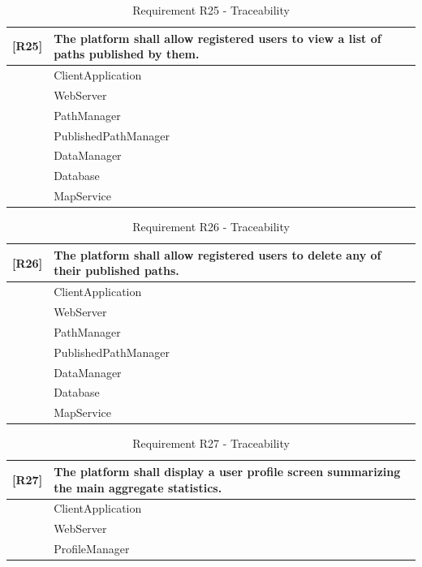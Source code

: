 \begin{table}[H]
    \centering
    \begin{tabular}{|p{1cm}|p{14cm}|}
    \hline
    \textbf{[R25]} & \textbf{The platform shall allow registered users to view a list of paths published by them.} \\ \hline
    [C1] & ClientApplication \\ \hline
    [C2] & WebServer \\ \hline
    [C7] & PathManager \\ \hline
    [C9] & PublishedPathManager \\ \hline
    [C15] & DataManager\\ \hline
    [C16] & Database\\ \hline
    [E2] & MapService \\ \hline
    \end{tabular}
    \caption{Requirement R25 - Traceability}
    \label{tab:RT25}
\end{table}

\begin{table}[H]
    \centering
    \begin{tabular}{|p{1cm}|p{14cm}|}
    \hline
    \textbf{[R26]} & \textbf{The platform shall allow registered users to delete any of their published paths.} \\ \hline
    [C1] & ClientApplication \\ \hline
    [C2] & WebServer \\ \hline
    [C7] & PathManager \\ \hline
    [C9] & PublishedPathManager \\ \hline
    [C15] & DataManager\\ \hline
    [C16] & Database\\ \hline
    [E2] & MapService \\ \hline
    \end{tabular}
    \caption{Requirement R26 - Traceability}
    \label{tab:RT26}
\end{table}

\begin{table}[H]
    \centering
    \begin{tabular}{|p{1cm}|p{14cm}|}
    \hline
    \textbf{[R27]} & \textbf{The platform shall display a user profile screen summarizing the main aggregate statistics.} \\ \hline
    [C1] & ClientApplication \\ \hline
    [C2] & WebServer \\ \hline
    [C6] & ProfileManager \\ \hline
    \end{tabular}
    \caption{Requirement R27 - Traceability}
    \label{tab:RT27}
\end{table}

